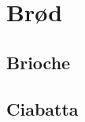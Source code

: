 \documentclass{book}
\begin{document}
{\chapter{Brød}
\section{Brioche}
\begin{minipage}[t]{0.5\textwidth}
\end{minipage}
\begin{minipage}[t]{0.5\textwidth}
\end{minipage}
\section{Ciabatta}
\begin{minipage}[t]{0.5\textwidth}
\end{minipage}
\begin{minipage}[t]{0.5\textwidth}
\end{minipage}
}
\end{document}
